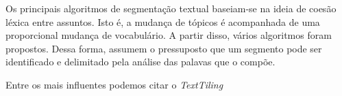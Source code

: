 Os principais algoritmos de segmentação textual baseiam-se na ideia de coesão léxica entre assuntos. Isto é, a mudança de tópicos é acompanhada de uma proporcional mudança de vocabulário. A partir disso, vários algoritmos foram propostos. Dessa forma, assumem o pressuposto que um segmento pode ser identificado e delimitado pela análise das palavas que o compõe.
 
 










	
%



Entre os mais influentes podemos citar o \textit{TextTiling}~\cite{Hearst1994}





%
%
%
%
%
